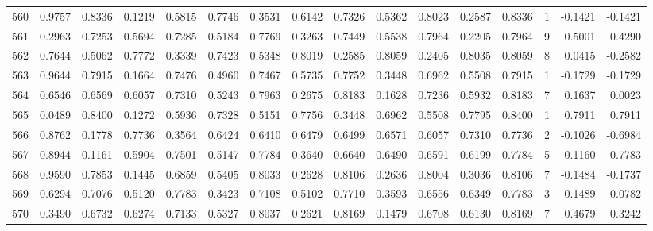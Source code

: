 \begin{tabular}{lrrrrrrrrrrrrrrr}
560 &      0.9757 &  0.8336 &  0.1219 &  0.5815 &  0.7746 &  0.3531 &  0.6142 &  0.7326 &  0.5362 &  0.8023 &   0.2587 &     0.8336 &      1 &                   -0.1421 &                    -0.1421 \\
561 &      0.2963 &  0.7253 &  0.5694 &  0.7285 &  0.5184 &  0.7769 &  0.3263 &  0.7449 &  0.5538 &  0.7964 &   0.2205 &     0.7964 &      9 &                    0.5001 &                     0.4290 \\
562 &      0.7644 &  0.5062 &  0.7772 &  0.3339 &  0.7423 &  0.5348 &  0.8019 &  0.2585 &  0.8059 &  0.2405 &   0.8035 &     0.8059 &      8 &                    0.0415 &                    -0.2582 \\
563 &      0.9644 &  0.7915 &  0.1664 &  0.7476 &  0.4960 &  0.7467 &  0.5735 &  0.7752 &  0.3448 &  0.6962 &   0.5508 &     0.7915 &      1 &                   -0.1729 &                    -0.1729 \\
564 &      0.6546 &  0.6569 &  0.6057 &  0.7310 &  0.5243 &  0.7963 &  0.2675 &  0.8183 &  0.1628 &  0.7236 &   0.5932 &     0.8183 &      7 &                    0.1637 &                     0.0023 \\
565 &      0.0489 &  0.8400 &  0.1272 &  0.5936 &  0.7328 &  0.5151 &  0.7756 &  0.3448 &  0.6962 &  0.5508 &   0.7795 &     0.8400 &      1 &                    0.7911 &                     0.7911 \\
566 &      0.8762 &  0.1778 &  0.7736 &  0.3564 &  0.6424 &  0.6410 &  0.6479 &  0.6499 &  0.6571 &  0.6057 &   0.7310 &     0.7736 &      2 &                   -0.1026 &                    -0.6984 \\
567 &      0.8944 &  0.1161 &  0.5904 &  0.7501 &  0.5147 &  0.7784 &  0.3640 &  0.6640 &  0.6490 &  0.6591 &   0.6199 &     0.7784 &      5 &                   -0.1160 &                    -0.7783 \\
568 &      0.9590 &  0.7853 &  0.1445 &  0.6859 &  0.5405 &  0.8033 &  0.2628 &  0.8106 &  0.2636 &  0.8004 &   0.3036 &     0.8106 &      7 &                   -0.1484 &                    -0.1737 \\
569 &      0.6294 &  0.7076 &  0.5120 &  0.7783 &  0.3423 &  0.7108 &  0.5102 &  0.7710 &  0.3593 &  0.6556 &   0.6349 &     0.7783 &      3 &                    0.1489 &                     0.0782 \\
570 &      0.3490 &  0.6732 &  0.6274 &  0.7133 &  0.5327 &  0.8037 &  0.2621 &  0.8169 &  0.1479 &  0.6708 &   0.6130 &     0.8169 &      7 &                    0.4679 &                     0.3242 \\

\end{tabular}
